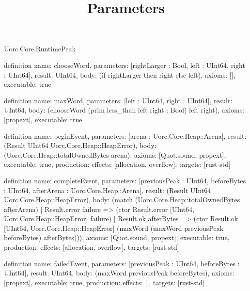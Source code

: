 \begin{lexlean}{Uorc.Core.RuntimePeak}
\title{Parameters}
\begin{semanticmodule}
definition{
  name: chooseWord,
  parameters: [rightLarger : Bool, left : UInt64, right : UInt64],
  result: UInt64,
  body: (if rightLarger then right else left),
  axioms: [],
  executable: true
}

definition{
  name: maxWord,
  parameters: [left : UInt64, right : UInt64],
  result: UInt64,
  body: (chooseWord (prim less_than left right : Bool) left right),
  axioms: [propext],
  executable: true
}

definition{
  name: beginEvent,
  parameters: [arena : Uorc.Core.Heap::Arena],
  result: (Result UInt64 Uorc.Core.Heap::HeapError),
  body: (Uorc.Core.Heap::totalOwnedBytes arena),
  axioms: [Quot.sound, propext],
  executable: true,
  production: {effects: [allocation, overflow], targets: [rust-std]}
}

definition{
  name: completeEvent,
  parameters: [previousPeak : UInt64, beforeBytes : UInt64, afterArena : Uorc.Core.Heap::Arena],
  result: (Result UInt64 Uorc.Core.Heap::HeapError),
  body: (match (Uorc.Core.Heap::totalOwnedBytes afterArena)
    | Result.error failure => (ctor Result.error [UInt64, Uorc.Core.Heap::HeapError] failure)
    | Result.ok afterBytes => (ctor Result.ok [UInt64, Uorc.Core.Heap::HeapError] (maxWord (maxWord previousPeak beforeBytes) afterBytes))),
  axioms: [Quot.sound, propext],
  executable: true,
  production: {effects: [allocation, overflow], targets: [rust-std]}
}

definition{
  name: failedEvent,
  parameters: [previousPeak : UInt64, beforeBytes : UInt64],
  result: UInt64,
  body: (maxWord previousPeak beforeBytes),
  axioms: [propext],
  executable: true,
  production: {effects: [], targets: [rust-std]}
}
\end{semanticmodule}
\end{lexlean}
